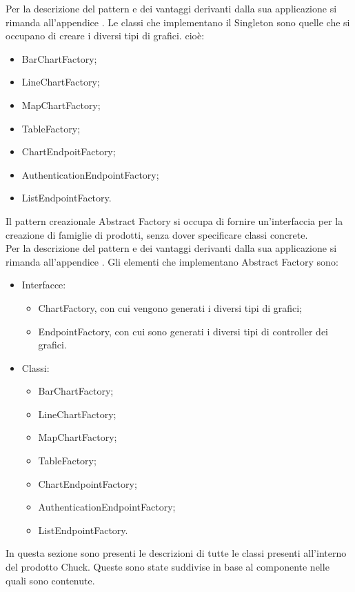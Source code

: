 	Per la descrizione del pattern e dei vantaggi derivanti dalla sua applicazione si rimanda all'appendice .
	Le classi che implementano il Singleton sono quelle che si occupano di creare i diversi tipi di grafici. cioè:
	\begin{itemize}
	\item BarChartFactory;
	\item LineChartFactory;
	\item MapChartFactory;
	\item TableFactory;
	\item ChartEndpoitFactory;
	\item AuthenticationEndpointFactory;
	\item ListEndpointFactory.
	\end{itemize}
	Il pattern creazionale Abstract Factory si occupa di fornire un'interfaccia per la creazione di famiglie di prodotti, senza dover specificare classi concrete. \\
	Per la descrizione del pattern e dei vantaggi derivanti dalla sua applicazione si rimanda all'appendice .
	Gli elementi che implementano Abstract Factory sono:
	\begin{itemize}
	\item Interfacce:
		\begin{itemize}
			\item ChartFactory, con cui vengono generati i diversi tipi di grafici;
			\item EndpointFactory, con cui sono generati i diversi tipi di controller dei grafici.
		\end{itemize}
	\item Classi:
		\begin{itemize}
			\item BarChartFactory;
			\item LineChartFactory;
			\item MapChartFactory;
			\item TableFactory;
			\item ChartEndpointFactory;
			\item AuthenticationEndpointFactory;
			\item ListEndpointFactory.
		\end{itemize}
	\end{itemize}
		
		
		
		In questa sezione sono presenti le descrizioni di tutte le classi presenti all'interno del prodotto Chuck. Queste sono state suddivise in base al componente nelle quali sono contenute.
		
